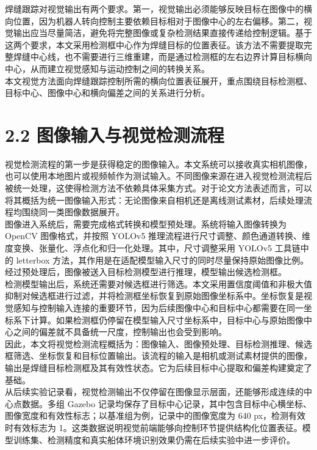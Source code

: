 \documentclass[UTF8,a4paper,12pt]{ctexrep}
\begin{document}
焊缝跟踪对视觉输出有两个要求。第一，视觉输出必须能够反映目标在图像中的横向位置，因为机器人转向控制主要依赖目标相对于图像中心的左右偏移。第二，视觉输出应当尽量简洁，避免将完整图像或复杂检测结果直接传递给控制逻辑。基于这两个要求，本文采用检测框中心作为焊缝目标的位置表征。该方法不需要提取完整焊缝中心线，也不需要进行三维重建，而是通过检测框的左右边界计算目标横向中心，从而建立视觉感知与运动控制之间的转换关系。\\

本文视觉方法面向焊缝跟踪控制所需的横向位置表征展开，重点围绕目标检测框、目标中心、图像中心和横向偏差之间的关系进行分析。\\

\section{2.2 图像输入与视觉检测流程}

视觉检测流程的第一步是获得稳定的图像输入。本文系统可以接收真实相机图像，也可以使用本地图片或视频帧作为测试输入。不同图像来源在进入视觉检测流程后被统一处理，这使得检测方法不依赖具体采集方式。对于论文方法表述而言，可以将其概括为统一图像输入形式：无论图像来自相机还是离线测试素材，后续处理流程均围绕同一类图像数据展开。\\

图像进入系统后，需要完成格式转换和模型预处理。系统将输入图像转换为 OpenCV 图像格式，并按照 YOLOv5 推理流程进行尺寸调整、颜色通道转换、维度变换、张量化、浮点化和归一化处理。其中，尺寸调整采用 YOLOv5 工具链中的 letterbox 方法，其作用是在适配模型输入尺寸的同时尽量保持原始图像比例。经过预处理后，图像被送入目标检测模型进行推理，模型输出候选检测框。\\

检测模型输出后，系统还需要对候选框进行筛选。本文采用置信度阈值和非极大值抑制对候选框进行过滤，并将检测框坐标恢复到原始图像坐标系中。坐标恢复是视觉感知与控制输入连接的重要环节，因为后续图像中心和目标中心都需要在同一坐标系下计算。如果检测框仍停留在模型输入尺寸坐标系中，目标中心与原始图像中心之间的偏差就不具备统一尺度，控制输出也会受到影响。\\

因此，本文将视觉检测流程概括为：图像输入、图像预处理、目标检测推理、候选框筛选、坐标恢复和目标位置输出。该流程的输入是相机或测试素材提供的图像，输出是焊缝目标检测框及其有效性状态。它为后续目标中心提取和偏差构建奠定了基础。\\

从后续实验记录看，视觉检测输出不仅停留在图像显示层面，还能够形成连续的中心点数据。多组 Gazebo 记录均保存了目标中心记录，其中包含目标中心横坐标、图像宽度和有效性标志；以基准组为例，记录中的图像宽度为 640 px，检测有效时有效标志为 1。这类数据说明视觉前端能够向控制环节提供结构化位置表征。模型训练集、检测精度和真实船体环境识别效果仍需在后续实验中进一步评价。\\
\end{document}
